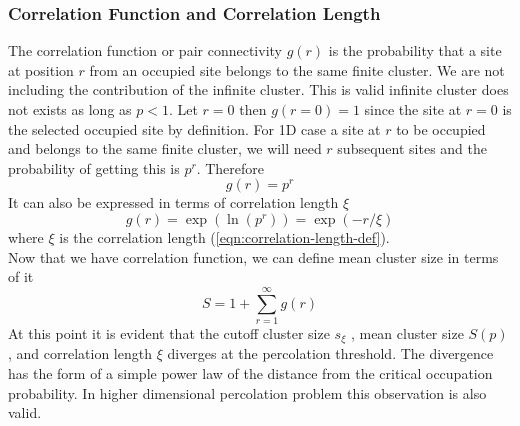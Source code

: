 		\subsubsection{Correlation Function and Correlation Length}
		The correlation function or pair connectivity $g(r)$ is the probability that a site at position $r$ from an occupied site belongs to the same finite cluster. We are not including the contribution of the infinite cluster. This is valid infinite cluster does not exists as long as $p<1$. Let $r=0$ then $g(r=0)=1$ since the site at $r=0$ is the selected occupied site by definition. For 1D case a site at $r$ to be occupied and belongs to the same finite cluster, we will need $r$ subsequent sites and the probability of getting this is $p^r$. Therefore
		\begin{equation}
			g(r) = p^r
		\end{equation}
		It can also be expressed in terms of correlation length $\xi$
		\begin{equation}
			g(r) = \exp (\ln(p^r)) = \exp(-r/\xi)
		\end{equation}
		where $\xi$ is the correlation length (\ref{eqn:correlation-length-def}).\\
		Now that we have correlation function, we can define mean cluster size in terms of it
		\begin{equation}
			S = 1 + \sum_{r=1}^{\infty} g(r)
			\label{eqn:mean-cluster-size-correlation-function}
		\end{equation}
		At this point it is evident that the cutoff cluster size $s_\xi$ , mean cluster size $S(p)$, and correlation length $\xi$ diverges at the percolation threshold. The divergence has the form of a	simple power law of the distance from the critical occupation probability. In higher dimensional percolation problem this observation is also valid.
		
